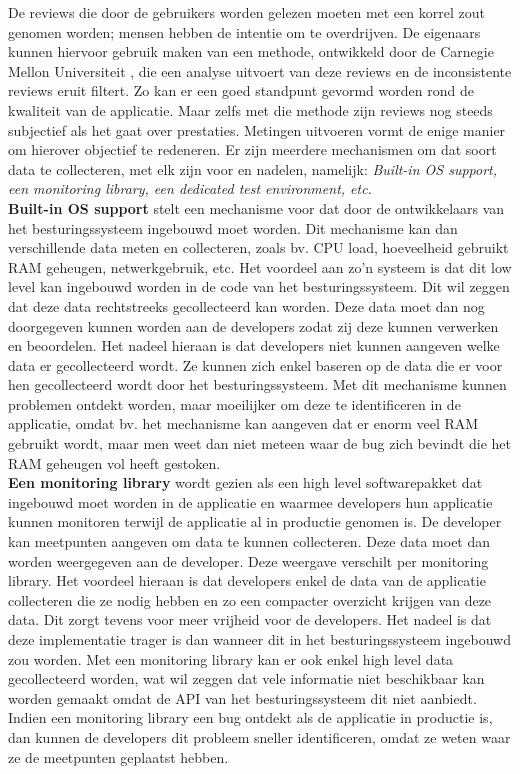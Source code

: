 De reviews die door de gebruikers worden gelezen moeten met een korrel zout genomen worden; mensen hebben de intentie om te overdrijven. De eigenaars kunnen hiervoor gebruik maken van een methode, ontwikkeld door de Carnegie Mellon Universiteit \cite{fu2013people}, die een analyse uitvoert van deze reviews en de inconsistente reviews eruit filtert. Zo kan er een goed standpunt gevormd worden rond de kwaliteit van de applicatie. Maar zelfs met die methode zijn reviews nog steeds subjectief als het gaat over prestaties. Metingen uitvoeren vormt de enige manier om hierover objectief te redeneren. Er zijn meerdere mechanismen om dat soort data te collecteren, met elk zijn voor en nadelen, namelijk: \textit{Built-in OS support, een monitoring library, een dedicated test environment, etc.}\\

\textbf{Built-in OS support} stelt een mechanisme voor dat door de ontwikkelaars van het besturingssysteem ingebouwd moet worden. Dit mechanisme kan dan verschillende data meten en collecteren, zoals bv. CPU load, hoeveelheid gebruikt RAM geheugen, netwerkgebruik, etc. Het voordeel aan zo'n systeem is dat dit low level kan ingebouwd worden in de code van het besturingssysteem. Dit wil zeggen dat deze data rechtstreeks gecollecteerd kan worden. Deze data moet dan nog doorgegeven kunnen worden aan de developers zodat zij deze kunnen verwerken en beoordelen. Het nadeel hieraan is dat developers niet kunnen aangeven welke data er gecollecteerd wordt. Ze kunnen zich enkel baseren op de data die er voor hen gecollecteerd wordt door het besturingssysteem. Met dit mechanisme kunnen problemen ontdekt worden, maar moeilijker om deze te identificeren in de applicatie, omdat bv. het mechanisme kan aangeven dat er enorm veel RAM gebruikt wordt, maar men weet dan niet meteen waar de bug zich bevindt die het RAM geheugen vol heeft gestoken.\\

\textbf{Een monitoring library} wordt gezien als een high level softwarepakket dat ingebouwd moet worden in de applicatie en waarmee developers hun applicatie kunnen monitoren terwijl de applicatie al in productie genomen is. De developer kan meetpunten aangeven om data te kunnen collecteren. Deze data moet dan worden weergegeven aan de developer. Deze weergave verschilt per monitoring library. Het voordeel hieraan is dat developers enkel de data van de applicatie collecteren die ze nodig hebben en zo een compacter overzicht krijgen van deze data. Dit zorgt tevens voor meer vrijheid voor de developers. Het nadeel is dat deze implementatie trager is dan wanneer dit in het besturingssysteem ingebouwd zou worden. Met een monitoring library kan er ook enkel high level data gecollecteerd worden, wat wil zeggen dat vele informatie niet beschikbaar kan worden gemaakt omdat de API van het besturingssysteem dit niet aanbiedt. Indien een monitoring library een bug ontdekt als de applicatie in productie is, dan kunnen de developers dit probleem sneller identificeren, omdat ze weten waar ze de meetpunten geplaatst hebben. \\


